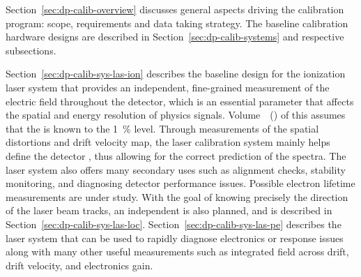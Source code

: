 Section~\ref{sec:dp-calib-overview} discusses general aspects driving the calibration program: scope, requirements and data taking strategy.
The baseline calibration hardware designs are described in Section~\ref{sec:dp-calib-systems} and respective subsections. 

Section~\ref{sec:dp-calib-sys-las-ion} describes the baseline design for the ionization laser system that provides an independent, fine-grained measurement of the electric field throughout the detector, which is an essential parameter that affects the spatial and energy resolution of physics signals. 
Volume~\volnumberphysics~(\voltitlephysics) of this 
assumes that the  is known to the \SI{1}{\%} level. Through measurements of the spatial distortions and drift velocity map, the laser calibration system mainly helps define the detector , thus allowing for the correct prediction of the  spectra. The laser system also offers many secondary uses such as alignment checks, stability monitoring, and diagnosing detector performance issues. 
Possible electron lifetime measurements are under study. 
With the goal of knowing precisely the direction of the laser beam tracks, an independent 
is also planned, and is described in Section~\ref{sec:dp-calib-sys-las-loc}.
Section~\ref{sec:dp-calib-sys-las-pe} describes the \phel laser system that can be used to rapidly diagnose electronics or  response issues along with many other useful measurements such as integrated field across drift, drift velocity, and electronics gain. 

